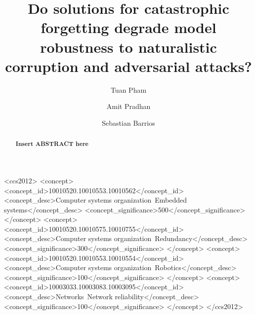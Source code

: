 \documentclass[manuscript,screen,review]{acmart}
\begin{document}
\title{Do solutions for catastrophic forgetting degrade model robustness to naturalistic corruption and adversarial attacks?}

\author{Tuan Pham}

\author{Amit Pradhan}

\author{Sebastian Barrios}


\begin{abstract}
  \textbf{Insert ABSTRACT here}
\end{abstract}


\begin{CCSXML}
<ccs2012>
 <concept>
  <concept_id>10010520.10010553.10010562</concept_id>
  <concept_desc>Computer systems organization~Embedded systems</concept_desc>
  <concept_significance>500</concept_significance>
 </concept>
 <concept>
  <concept_id>10010520.10010575.10010755</concept_id>
  <concept_desc>Computer systems organization~Redundancy</concept_desc>
  <concept_significance>300</concept_significance>
 </concept>
 <concept>
  <concept_id>10010520.10010553.10010554</concept_id>
  <concept_desc>Computer systems organization~Robotics</concept_desc>
  <concept_significance>100</concept_significance>
 </concept>
 <concept>
  <concept_id>10003033.10003083.10003095</concept_id>
  <concept_desc>Networks~Network reliability</concept_desc>
  <concept_significance>100</concept_significance>
 </concept>
</ccs2012>
\end{CCSXML}
\end{document}
